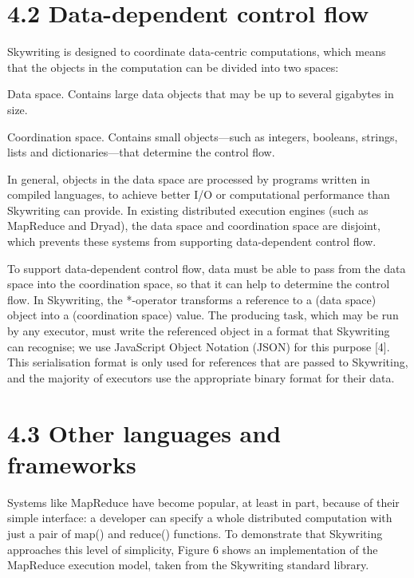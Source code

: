 \documentclass[
]{article}
\begin{document}
\section{4.2 Data-dependent control
flow}\label{data-dependent-control-flow}

Skywriting is designed to coordinate data-centric computations, which
means that the objects in the computation can be divided into two
spaces:

Data space. Contains large data objects that may be up to several
gigabytes in size.

Coordination space. Contains small objects---such as integers, booleans,
strings, lists and dictionaries---that determine the control flow.

In general, objects in the data space are processed by programs written
in compiled languages, to achieve better I/O or computational
performance than Skywriting can provide. In existing distributed
execution engines (such as MapReduce and Dryad), the data space and
coordination space are disjoint, which prevents these systems from
supporting data-dependent control flow.

To support data-dependent control flow, data must be able to pass from
the data space into the coordination space, so that it can help to
determine the control flow. In Skywriting, the *-operator transforms a
reference to a (data space) object into a (coordination space) value.
The producing task, which may be run by any executor, must write the
referenced object in a format that Skywriting can recognise; we use
JavaScript Object Notation (JSON) for this purpose {[}4{]}. This
serialisation format is only used for references that are passed to
Skywriting, and the majority of executors use the appropriate binary
format for their data.

\section{4.3 Other languages and
frameworks}\label{other-languages-and-frameworks}

Systems like MapReduce have become popular, at least in part, because of
their simple interface: a developer can specify a whole distributed
computation with just a pair of map() and reduce() functions. To
demonstrate that Skywriting approaches this level of simplicity, Figure
6 shows an implementation of the MapReduce execution model, taken from
the Skywriting standard library.
\end{document}
